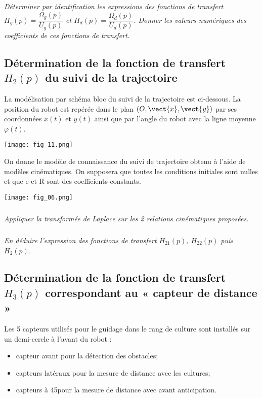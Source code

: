 \begin{multicols}{2}
\subparagraph{}
\textit{Déterminer par identification les expressions des fonctions de transfert $H_g(p) = \dfrac{\Omega_g(p)}{U_g(p)}$ et
$H_d(p) = \dfrac{\Omega_d(p)}{U_d(p)}$.  Donner les valeurs numériques des coefficients de ces fonctions de transfert. }
\ifprof
\begin{corrige}
\end{corrige}
\else
\fi


\subsection*{Détermination de la fonction de transfert $H_2 (p)$ du suivi de la trajectoire}

\ifprof
\else
La modélisation par schéma bloc du suivi de la trajectoire est ci-dessous. La position du robot est repérée dans le plan $\left(O,\vect{x},\vect{y}\right)$ par ses coordonnées $x(t)$ et $y(t)$ ainsi que par l’angle du robot avec la ligne moyenne $\varphi(t)$. 

\begin{center}
\texttt{[image: fig\_11.png]}
\end{center}


On donne le modèle de connaissance du suivi de trajectoire obtenu à l’aide de modèles cinématiques. On supposera que toutes les conditions initiales sont nulles et que e et R sont des coefficients constants. 

\begin{center}
\texttt{[image: fig\_06.png]}
\end{center}

\fi

\subparagraph{}
\textit{Appliquer la transformée de Laplace sur les 2 relations cinématiques proposées. }
\ifprof
\begin{corrige}
\end{corrige}
\else
\fi


\subparagraph{}
\textit{ En déduire l’expression des  fonctions de transfert $H_{21} (p)$, $H_{22} (p)$ puis $H_2 (p)$.  }
\ifprof
\begin{corrige}
\end{corrige}
\else
\fi

 \subsection*{Détermination de la fonction de transfert $H_3 (p)$ correspondant au « capteur de distance » }
\ifprof
\else
Les 5 capteurs utilisés pour le guidage dans le  rang de culture sont installés sur un demi-cercle à l’avant du robot : 
\begin{itemize}
\item capteur avant pour la détection des obstacles;
\item capteurs latéraux pour la mesure de distance avec les cultures;
\item capteurs à 45\degres pour la mesure de distance avec avant  anticipation. 
\end{itemize}


\end{multicols}
